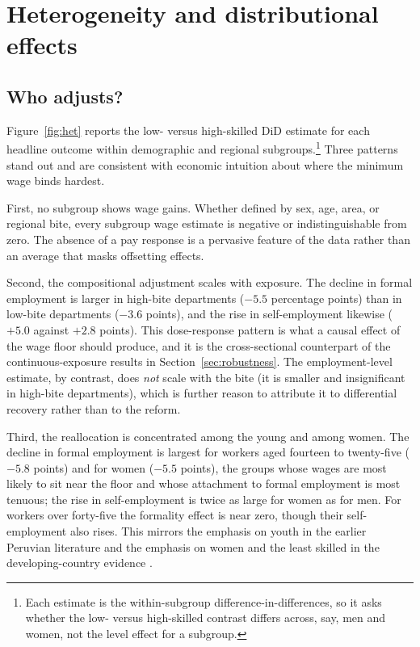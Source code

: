 \section{Heterogeneity and distributional effects}\label{sec:heterogeneity}

\subsection{Who adjusts?}

Figure~\ref{fig:het} reports the low- versus high-skilled DiD estimate for each headline
outcome within demographic and regional subgroups.\footnote{Each estimate is the
within-subgroup difference-in-differences, so it asks whether the low- versus high-skilled
contrast differs across, say, men and women, not the level effect for a subgroup.} Three
patterns stand out and are
consistent with economic intuition about where the minimum wage binds hardest.

First, no subgroup shows wage gains. Whether defined by sex, age, area, or regional bite,
every subgroup wage estimate is negative or indistinguishable from zero. The absence of a
pay response is a pervasive feature of the data rather than an average that masks
offsetting effects.

Second, the compositional adjustment scales with exposure. The decline in formal
employment is larger in high-bite departments ($-5.5$ percentage points) than in low-bite
departments ($-3.6$ points), and the rise in self-employment likewise ($+5.0$ against
$+2.8$ points). This dose-response pattern is what a causal effect of the wage floor
should produce, and it is the cross-sectional counterpart of the continuous-exposure
results in Section~\ref{sec:robustness}. The employment-level estimate, by contrast, does
\emph{not} scale with the bite (it is smaller and insignificant in high-bite
departments), which is further reason to attribute it to differential recovery rather
than to the reform.

Third, the reallocation is concentrated among the young and among women. The decline in
formal employment is largest for workers aged fourteen to twenty-five ($-5.8$ points) and
for women ($-5.5$ points), the groups whose wages are most likely to sit near the floor
and whose attachment to formal employment is most tenuous; the rise in self-employment is
twice as large for women as for men. For workers over forty-five the formality effect is
near zero, though their self-employment also rises. This mirrors the emphasis on youth in
the earlier Peruvian literature \citep{cespedes_2005, jaramillo_lopez_2006} and the
emphasis on women and the least skilled in the developing-country evidence
\citep{katzkowicz_2021_uruguay, lemos_2009}.

